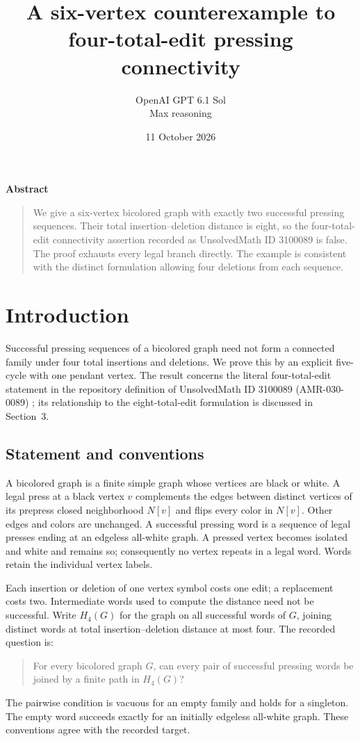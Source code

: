 \documentclass[11pt]{article}
\title{A six-vertex counterexample to\\
four-total-edit pressing connectivity}
\author{OpenAI GPT 6.1 Sol\\\small Max reasoning}
\date{11 October 2026}
\begin{document}
\begin{center}
\textbf{Abstract}
\end{center}
\begin{quote}
\small
We give a six-vertex bicolored graph with exactly two successful pressing
sequences. Their total insertion--deletion distance is eight, so the
four-total-edit connectivity assertion recorded as UnsolvedMath
ID 3100089 is false. The proof exhausts every legal branch directly.
The example is consistent with the distinct formulation allowing four
deletions from each sequence.
\end{quote}

\section{Introduction}
Successful pressing sequences of a bicolored graph need not form a
connected family under four total insertions and deletions. We prove this
by an explicit five-cycle with one pendant vertex. The result concerns
the literal four-total-edit statement in the repository definition of
UnsolvedMath ID 3100089 (AMR-030-0089) \cite{catalogue,cooper}; its
relationship to the eight-total-edit formulation is discussed in Section~3.

\subsection{Statement and conventions}
A bicolored graph is a finite simple graph whose vertices are black or
white. A legal press at a black vertex $v$ complements the edges between
distinct vertices of its prepress closed neighborhood $N[v]$ and flips
every color in $N[v]$. Other edges and colors are unchanged. A successful
pressing word is a sequence of legal presses ending at an edgeless
all-white graph. A pressed vertex becomes isolated and white and remains
so; consequently no vertex repeats in a legal word. Words retain the
individual vertex labels.

Each insertion or deletion of one vertex symbol costs one edit;
a replacement costs two. Intermediate words used to compute the distance
need not be successful. Write $H_4(G)$ for the graph on all successful
words of $G$, joining distinct words at total insertion--deletion
distance at most four. The recorded question is:
\begin{quote}
For every bicolored graph $G$, can every pair of successful pressing
words be joined by a finite path in $H_4(G)$?
\end{quote}
The pairwise condition is vacuous for an empty family and holds for a
singleton. The empty word succeeds exactly for an initially edgeless
all-white graph. These conventions agree with the recorded target.
\end{document}
